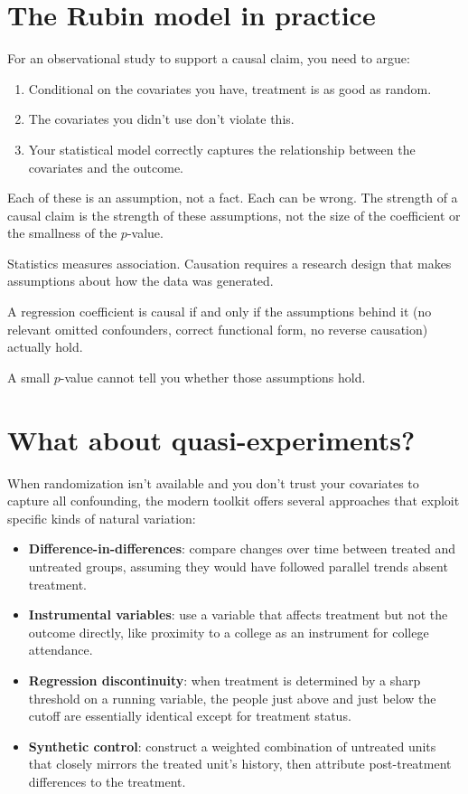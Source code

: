 \section{The Rubin model in practice}

For an observational study to support a causal claim, you need to argue:
\begin{enumerate}[noitemsep]
\item Conditional on the covariates you have, treatment is as good as random.
\item The covariates you didn't use don't violate this.
\item Your statistical model correctly captures the relationship between the covariates and the outcome.
\end{enumerate}
Each of these is an assumption, not a fact. Each can be wrong. The strength of a causal claim is the strength of these assumptions, not the size of the coefficient or the smallness of the $p$-value.

\begin{keyinsight}
Statistics measures association. Causation requires a research design that makes assumptions about how the data was generated.

A regression coefficient is causal if and only if the assumptions behind it (no relevant omitted confounders, correct functional form, no reverse causation) actually hold.

A small $p$-value cannot tell you whether those assumptions hold.
\end{keyinsight}

\section{What about quasi-experiments?}

When randomization isn't available and you don't trust your covariates to capture all confounding, the modern toolkit offers several approaches that exploit specific kinds of natural variation:

\begin{itemize}
\item \textbf{Difference-in-differences}: compare changes over time between treated and untreated groups, assuming they would have followed parallel trends absent treatment.
\item \textbf{Instrumental variables}: use a variable that affects treatment but not the outcome directly, like proximity to a college as an instrument for college attendance.
\item \textbf{Regression discontinuity}: when treatment is determined by a sharp threshold on a running variable, the people just above and just below the cutoff are essentially identical except for treatment status.
\item \textbf{Synthetic control}: construct a weighted combination of untreated units that closely mirrors the treated unit's history, then attribute post-treatment differences to the treatment.
\end{itemize}

